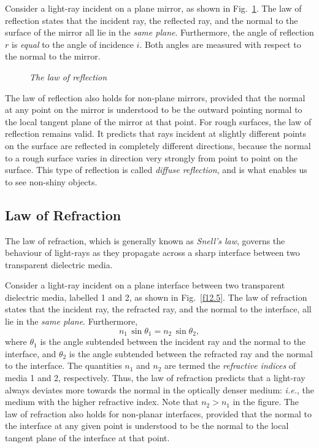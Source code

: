 Consider a light-ray incident on a plane mirror, as shown in Fig.~\ref{f12.4}.
The law of reflection states that the incident ray, the reflected
ray, and the normal to the surface of the mirror all lie in the
{\em same plane}. Furthermore, the angle of reflection $r$ is {\em
equal}\/
to the angle of incidence $i$. Both angles are measured with
respect to the normal to the mirror.

\begin{figure}
\epsfysize=2.5in
\centerline{}
\caption{\em The law of reflection}\label{f12.4}
\end{figure}

The law of reflection also holds for non-plane mirrors, provided
that the normal at any
point on the mirror is understood to be the outward pointing
normal to the local tangent plane of the mirror at that point. 
For rough surfaces, the law of reflection remains valid. It
predicts 
that  rays incident at slightly different points on the
surface are reflected in completely different directions, because
the normal to a rough surface varies in direction very strongly from
point to point on the surface. This type of reflection is called
{\em diffuse reflection}, and is what enables us to see non-shiny 
 objects. 

\subsection{Law of Refraction}
The law of refraction, which is generally
known as {\em Snell's law}, governs the behaviour of light-rays as
they propagate across a sharp interface between two 
transparent dielectric media. 

Consider a light-ray incident on a plane interface between two
transparent dielectric media, labelled 1 and 2, as shown in Fig.~\ref{f12.5}.
The law of refraction states that the incident ray, the refracted ray,
and the normal to the interface, all lie in the {\em same plane}. 
Furthermore, 
\begin{equation}
n_1\,\sin\theta_1 = n_2\,\sin\theta_2,
\end{equation}
where $\theta_1$ is  the angle subtended between the incident ray and
the normal to the interface, and $\theta_2$ is the angle subtended between the
refracted ray and the normal to the
interface. The quantities $n_1$ and $n_2$ are
termed the {\em refractive indices}\/ of media 1 and 2, respectively.
Thus, the law of refraction predicts that a light-ray always
deviates more towards
 the normal in the optically denser medium: {\em i.e.},
the medium with the higher refractive index. Note that $n_2>n_1$ in the figure. The law of refraction also holds for non-planar
interfaces, provided that the normal to the interface at any given point
is understood to be the normal to the local tangent plane of the
interface at that
point.

